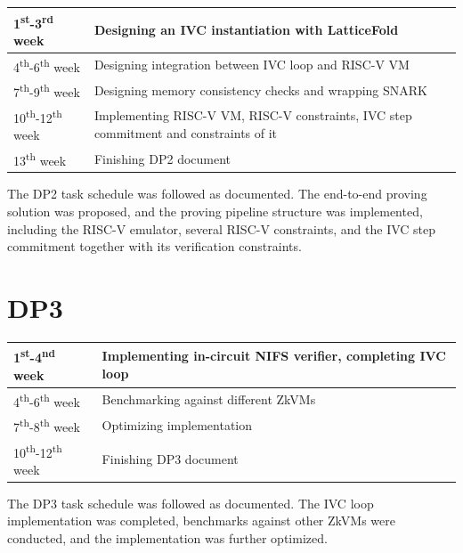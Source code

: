 \begin{tabular}{|l||p{}|}
	\hline
	1\textsuperscript{st}-3\textsuperscript{rd} week   & Designing an IVC instantiation with LatticeFold                                       \\
	\hline
	4\textsuperscript{th}-6\textsuperscript{th} week   & Designing integration between IVC loop and RISC-V VM                                  \\
	\hline
	7\textsuperscript{th}-9\textsuperscript{th} week   & Designing memory consistency checks and wrapping SNARK                                \\
	\hline
	10\textsuperscript{th}-12\textsuperscript{th} week & Implementing RISC-V VM, RISC-V constraints, IVC step commitment and constraints of it \\
	\hline
	13\textsuperscript{th} week                        & Finishing DP2 document                                                                \\
	\hline
\end{tabular}

The DP2 task schedule was followed as documented. The end-to-end proving solution
was proposed, and the proving pipeline structure was implemented, including the RISC-V
emulator, several RISC-V constraints, and the IVC step commitment together with
its verification constraints.

\section{DP3}

\begin{tabular}{|l||p{}|}
	\hline
	1\textsuperscript{st}-4\textsuperscript{nd} week   & Implementing in-circuit NIFS verifier, completing IVC loop \\
	\hline
	4\textsuperscript{th}-6\textsuperscript{th} week   & Benchmarking against different ZkVMs                       \\
	\hline
	7\textsuperscript{th}-8\textsuperscript{th} week   & Optimizing implementation                                  \\
	\hline
	10\textsuperscript{th}-12\textsuperscript{th} week & Finishing DP3 document                                     \\
	\hline
\end{tabular}

The DP3 task schedule was followed as documented. The IVC loop implementation
was completed, benchmarks against other ZkVMs were conducted, and the
implementation was further optimized.
